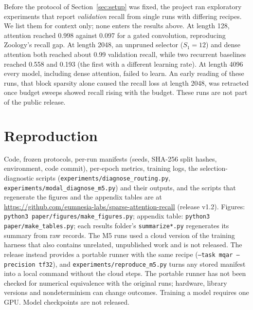 Before the protocol of Section~\ref{sec:setup} was fixed, the project ran exploratory experiments that report
\emph{validation} recall from single runs with differing recipes. We list them for context only; none enters the
results above. At length 128, attention reached 0.998 against 0.097 for a gated convolution, reproducing Zoology's
recall gap. At length 2048, an unpruned selector ($S_1{=}12$) and dense attention both reached about 0.99 validation
recall, while two recurrent baselines reached 0.558 and 0.193 (the first with a different learning rate). At length
4096 every model, including dense attention, failed to learn. An early reading of these runs, that block sparsity
alone caused the recall loss at length 2048, was retracted once budget sweeps showed recall rising with the budget. These runs are not part of the public release.

\section{Reproduction}
\label{app:repro}

Code, frozen protocols, per-run manifests (seeds, SHA-256 split hashes, environment, code commit), per-epoch
metrics, training logs, the selection-diagnostic scripts (\texttt{experiments/diagnose\_routing.py},
\texttt{experiments/modal\_diagnose\_m5.py}) and their outputs, and the scripts that regenerate the figures
and the appendix tables are at
\url{https://github.com/eumnesia-labs/sparse-attention-recall} (release v1.2). Figures: \texttt{python3 paper/figures/make\_figures.py};
appendix table: \texttt{python3 paper/make\_tables.py}; each results folder's \texttt{summarize*.py} regenerates its
summary from raw records. The M5 runs used a cloud version of the training harness that also contains unrelated,
unpublished work and is not released. The release instead provides a portable runner with the same recipe
(\texttt{--task mqar --precision tf32}), and \texttt{experiments/reproduce\_m5.py} turns any stored manifest into a
local command without the cloud steps. The portable runner has not been checked for numerical equivalence with the
original runs; hardware, library versions and nondeterminism can change outcomes. Training a model requires one GPU.
Model checkpoints are not released.
